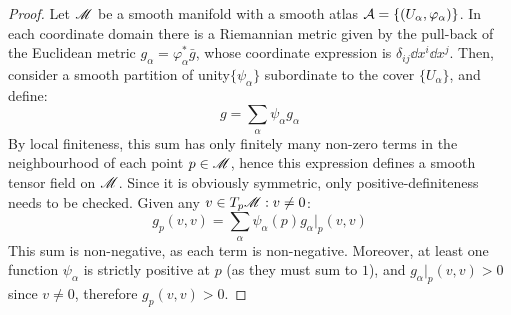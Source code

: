 \begin{proofbox}
  \begin{proof}
    Let $ \mathscr{M} $ be a smooth manifold with a smooth atlas $ \mathcal{A} = \{(U_\alpha , \varphi_\alpha)\} $. In each coordinate domain there is a Riemannian metric given by the pull-back of the Euclidean metric $ g_\alpha = \varphi_\alpha^* \bar{g} $, whose coordinate expression is $ \delta_{ij} \dd x^i \dd x^j $. Then, consider a smooth partition of unity\footnotemark $ \{\psi_\alpha\} $ subordinate to the cover $ \{U_\alpha\} $, and define:
    \begin{equation*}
      g = \sum_\alpha \psi_\alpha g_\alpha
    \end{equation*}
    By local finiteness, this sum has only finitely many non-zero terms in the neighbourhood of each point $ p \in \mathscr{M} $, hence this expression defines a smooth tensor field on $ \mathscr{M} $. Since it is obviously symmetric, only positive-definiteness needs to be checked. Given any $ v \in T_p\mathscr{M} : v \neq 0 $:
    \begin{equation*}
      g_p(v,v) = \sum_\alpha \psi_\alpha(p) g_\alpha \vert_p(v,v)
    \end{equation*}
    This sum is non-negative, as each term is non-negative. Moreover, at least one function $ \psi_\alpha $ is strictly positive at $ p $ (as they must sum to $ 1 $), and $ g_\alpha \vert_p(v,v) > 0 $ since $ v \neq 0 $, therefore $ g_p(v,v) > 0 $.
  \end{proof}
\end{proofbox}


